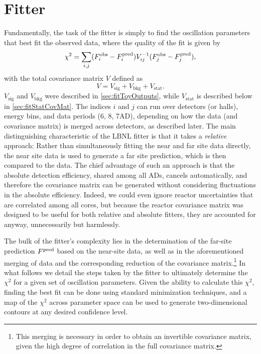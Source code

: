 \documentclass[../thesis.tex]{subfiles}
\begin{document}
\section{Fitter}
\label{sec:fitFitter}

Fundamentally, the task of the fitter \cite{berkeley_shapefit} is simply to find the oscillation parameters that best fit the observed data, where the quality of the fit is given by
\begin{equation}
  \chi^2 = \sum_{i,j} (F^{\mathrm{obs}}_i - F^{\mathrm{pred}}_i) V^{-1}_{ij} (F^{\mathrm{obs}}_j - F^{\mathrm{pred}}_j),
\end{equation}
with the total covariance matrix $V$ defined as
\begin{equation}
  V = V_{\mathrm{sig}} + V_{\mathrm{bkg}} + V_{\mathrm{stat}}.
\end{equation}
$V_{\mathrm{sig}}$ and $V_{\mathrm{bkg}}$ were described in \autoref{sec:fitToyOutputs}, while $V_{\mathrm{stat}}$ is described below in \autoref{sec:fitStatCovMat}. The indices $i$ and $j$ can run over detectors (or halls), energy bins, and data periods (6, 8, 7AD), depending on how the data (and covariance matrix) is merged across detectors, as described later. The main distinguishing characteristic of the LBNL fitter is that it takes a \emph{relative} approach: Rather than simultaneously fitting the near and far site data directly, the near site data is used to generate a far site prediction, which is then compared to the data. The chief advantage of such an approach is that the absolute detection efficiency, shared among all ADs, cancels automatically, and therefore the covariance matrix can be generated without considering fluctuations in the absolute efficiency. Indeed, we could even ignore reactor uncertainties that are correlated among all cores, but because the reactor covariance matrix was designed to be useful for both relative and absolute fitters, they are accounted for anyway, unnecessarily but harmlessly.

The bulk of the fitter's complexity lies in the determination of the far-site prediction $F^{\mathrm{pred}}$ based on the near-site data, as well as in the aforementioned merging of data and the corresponding reduction of the covariance matrix.\footnote{This merging is necessary in order to obtain an invertible covariance matrix, given the high degree of correlation in the full covariance matrix.} In what follows we detail the steps taken by the fitter to ultimately determine the $\chi^2$ for a given set of oscillation parameters. Given the ability to calculate this $\chi^2$, finding the best fit can be done using standard minimization techniques, and a map of the $\chi^2$ across parameter space can be used to generate two-dimensional contours at any desired confidence level.
\end{document}
